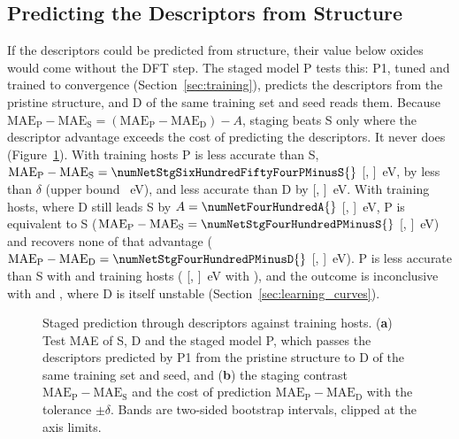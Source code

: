 \subsection{Predicting the Descriptors from Structure}
\label{sec:staging}

If the descriptors could be predicted from structure, their value below \numNetNStar{} oxides would come without the DFT step. The staged model P tests this: P1, tuned and trained to convergence (Section~\ref{sec:training}), predicts the descriptors from the pristine structure, and D of the same training set and seed reads them. Because $\mathrm{MAE}_\mathrm{P} - \mathrm{MAE}_\mathrm{S} = (\mathrm{MAE}_\mathrm{P} - \mathrm{MAE}_\mathrm{D}) - A$, staging beats S only where the descriptor advantage exceeds the cost of predicting the descriptors. It never does (Figure~\ref{fig:staging}). With \numCfgBudgetsMax{} training hosts P is less accurate than S, $\mathrm{MAE}_\mathrm{P} - \mathrm{MAE}_\mathrm{S} = \numNetStgSixHundredFiftyFourPMinusS{}$ [\numNetStgSixHundredFiftyFourPMinusSLo{}, \numNetStgSixHundredFiftyFourPMinusSHi{}]~eV, by less than $\delta$ (upper bound \numNetStgSixHundredFiftyFourPMinusSUpper{}~eV), and less accurate than D by \numNetStgSixHundredFiftyFourPMinusD{} [\numNetStgSixHundredFiftyFourPMinusDLo{}, \numNetStgSixHundredFiftyFourPMinusDHi{}]~eV. With \numCfgBudgetsHostsItemFive{} training hosts, where D still leads S by $A = \numNetFourHundredA{}$ [\numNetFourHundredALo{}, \numNetFourHundredAHi{}]~eV, P is equivalent to S ($\mathrm{MAE}_\mathrm{P} - \mathrm{MAE}_\mathrm{S} = \numNetStgFourHundredPMinusS{}$ [\numNetStgFourHundredPMinusSLo{}, \numNetStgFourHundredPMinusSHi{}]~eV) and recovers none of that advantage ($\mathrm{MAE}_\mathrm{P} - \mathrm{MAE}_\mathrm{D} = \numNetStgFourHundredPMinusD{}$ [\numNetStgFourHundredPMinusDLo{}, \numNetStgFourHundredPMinusDHi{}]~eV). P is less accurate than S with \numCfgBudgetsHostsItemThree{} and \numCfgBudgetsHostsItemFour{} training hosts (\numNetStgTwoHundredPMinusS{} [\numNetStgTwoHundredPMinusSLo{}, \numNetStgTwoHundredPMinusSHi{}]~eV with \numCfgBudgetsHostsItemFour{}), and the outcome is inconclusive with \numCfgBudgetsHostsItemOne{} and \numCfgBudgetsHostsItemTwo{}, where D is itself unstable (Section~\ref{sec:learning_curves}).

\begin{figure}[H]
\centering
{}
\caption{Staged prediction through descriptors against training hosts. (\textbf{a}) Test MAE of S, D and the staged model P, which passes the descriptors predicted by P1 from the pristine structure to D of the same training set and seed, and (\textbf{b}) the staging contrast $\mathrm{MAE}_\mathrm{P} - \mathrm{MAE}_\mathrm{S}$ and the cost of prediction $\mathrm{MAE}_\mathrm{P} - \mathrm{MAE}_\mathrm{D}$ with the tolerance $\pm\delta$. Bands are two-sided bootstrap intervals, clipped at the axis limits.\label{fig:staging}}
\end{figure}

